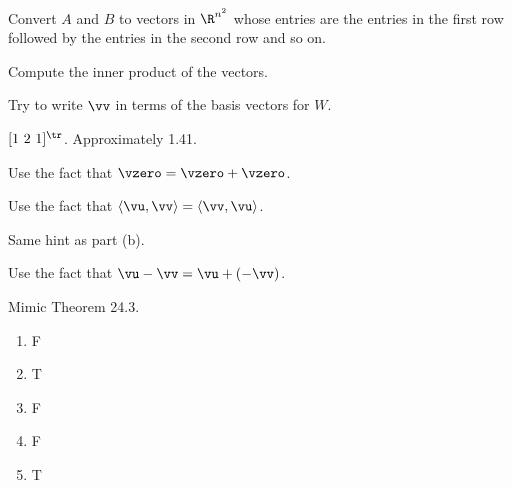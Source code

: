 \item Convert $A$ and $B$ to vectors in $\R^{n^2}$ whose entries are the entries in the first row followed by the entries in the second row and so on.   

\ea

\item  
\ba
\item Compute the inner product of the vectors. 

\item Try to write $\vv$ in terms of the basis vectors for $W$. 

\item $[1 \ 2 \ 1]^{\tr}$. Approximately 1.41.

\ea


\item 
\ba
\item Use the fact that $\vzero = \vzero + \vzero$.  

\item Use the fact that $\langle \vu, \vv \rangle = \langle \vv, \vu \rangle$.  

\item Same hint as part (b). 

\item Use the fact that $\vu - \vv = \vu + (-\vv)$. 

\ea

\item Mimic Theorem 24.3.

\oee


\be
\item[19.]
\begin{enumerate}[label=(\alph*), leftmargin=1\parindent]	
	\item F 
	\item T
	\item F 
	\item F   
  	\item T
	\end{enumerate}    

\ee

